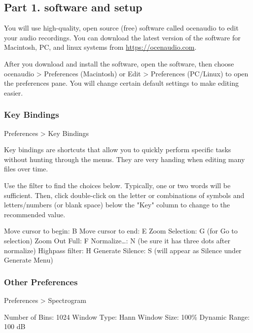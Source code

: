 \documentclass[12pt]{article}
\begin{document}
\thispagestyle{plain}

\subsection*{Part 1. software and setup}

You will use high-quality, open source (free) software called ocenaudio to edit your audio recordings. You can download the latest version of the software for Macintosh, PC, and linux systems from \url{https://ocenaudio.com}.

After you download and install the software, open the software, then choose ocenaudio > Preferences (Macintosh) or Edit > Preferences (PC/Linux) to open the preferences pane. You will change certain default settings to make editing easier.

\subsubsection*{Key Bindings}

Preferences > Key Bindings


Key bindings are shortcuts that allow you to quickly perform specific tasks without hunting through the menus. They are very handing when editing many files over time.


Use the filter to find the choices below. Typically, one or two words will be sufficient. Then, click double-click on the letter or combinations of symbols and letters/numbers (or blank space) below the "Key" column to change to the recommended value.

Move cursor to begin: B\newline
Move cursor to end: E\newline
Zoom Selection: G (for Go to selection)\newline
Zoom Out Full: F\newline
Normalize\ldots: N (be sure it has three dots after normalize)\newline
Highpass filter: H\newline
Generate Silence: S (will appear as Silence under Generate Menu)


\subsubsection*{Other Preferences}

Preferences > Spectrogram

Number of Bins: 1024\newline
Window Type: Hann\newline
Window Size: 100\%\newline
Dynamic Range: 100 dB
\end{document}
